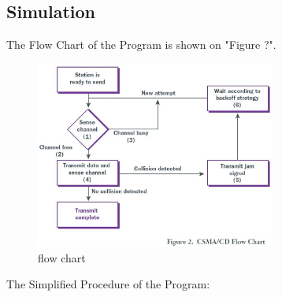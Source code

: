 \documentclass[11pt,a4paper]{report}
\begin{document}
\subsection*{Simulation}
The Flow Chart of the Program is shown on "Figure ?". \\
\begin{figure}
\centering
\includegraphics[width=0.7\textwidth]{4_1.eps}
\caption{flow chart}
\end{figure}

The Simplified Procedure of the Program: \\
\end{document}
